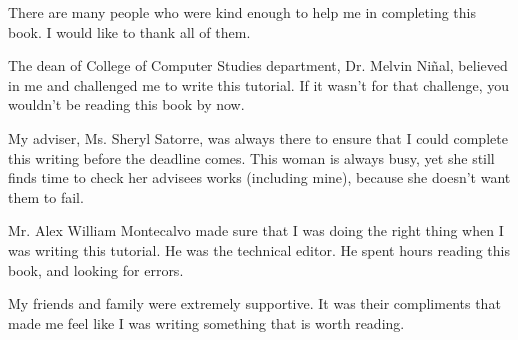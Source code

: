 There are many people who were kind enough to help me in completing this book. I would like to thank all of them.

The dean of College of Computer Studies department, Dr. Melvin Niñal, believed in me and challenged me to write this tutorial. If it wasn't for that challenge, you wouldn't be reading this book by now.

My adviser, Ms. Sheryl Satorre, was always there to ensure that I could complete this writing before the deadline comes. This woman is always busy, yet she still finds time to check her advisees works (including mine), because she doesn't want them to fail. 

Mr. Alex William Montecalvo made sure that I was doing the right thing when I was writing this tutorial. He was the technical editor. He spent hours reading this book, and looking for errors.

My friends and family were extremely supportive. It was their compliments that made me feel like I was writing something that is worth reading.
